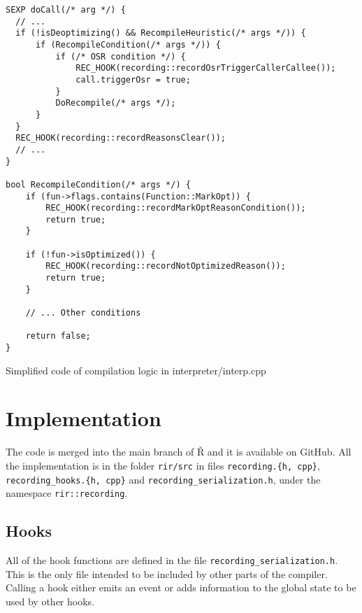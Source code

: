 \begin{listing}
	\centering
	\begin{verbatim}
SEXP doCall(/* arg */) {
  // ...
  if (!isDeoptimizing() && RecompileHeuristic(/* args */)) {
      if (RecompileCondition(/* args */)) {
          if (/* OSR condition */) {
              REC_HOOK(recording::recordOsrTriggerCallerCallee());
              call.triggerOsr = true;
          }
          DoRecompile(/* args */);
      }
  }
  REC_HOOK(recording::recordReasonsClear());
  // ...
}

bool RecompileCondition(/* args */) {
    if (fun->flags.contains(Function::MarkOpt)) {
        REC_HOOK(recording::recordMarkOptReasonCondition());
        return true;
    }

    if (!fun->isOptimized()) {
        REC_HOOK(recording::recordNotOptimizedReason());
        return true;
    }

    // ... Other conditions

    return false;
}
  \end{verbatim}
	\caption{Simplified code of compilation logic in interpreter/interp.cpp}\label{lst:hook-docall}
\end{listing}

\section{Implementation}

The code is merged into the main branch of Ř and it is available on GitHub\cite{rsh-github}. All the implementation is in the folder \texttt{rir/src} in files \texttt{recording.\{h, cpp\}}, \texttt{recording\_hooks.\{h, cpp\}} and \texttt{recording\_serialization.h}, under the namespace \texttt{rir::recording}.

\subsection{Hooks}

All of the hook functions are defined in the file \texttt{recording\_serialization.h}. This is the only file intended to be included by other parts of the compiler. Calling a hook either emits an event or adds information to the global state to be used by other hooks.

